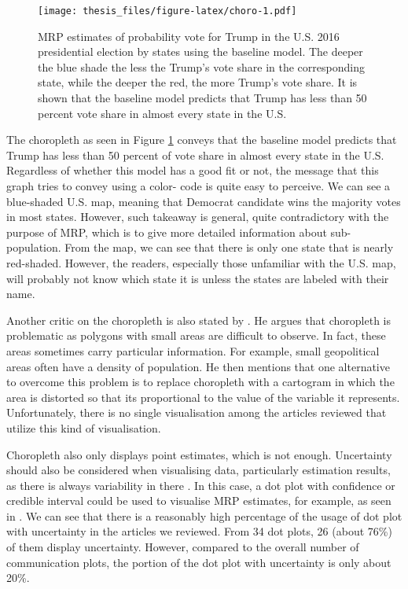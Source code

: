 \documentclass{monashthesis}
\begin{document}
\begin{figure}
\centering
\texttt{[image: thesis\_files/figure-latex/choro-1.pdf]}
\caption{\label{fig:choro}MRP estimates of probability vote for Trump in the U.S. 2016 presidential election by states using the baseline model. The deeper the blue shade the less the Trump's vote share in the corresponding state, while the deeper the red, the more Trump's vote share. It is shown that the baseline model predicts that Trump has less than 50 percent vote share in almost every state in the U.S.}
\end{figure}

The choropleth as seen in Figure \ref{fig:choro} conveys that the baseline model predicts that Trump has less than 50 percent of vote share in almost every state in the U.S. Regardless of whether this model has a good fit or not, the message that this graph tries to convey using a color- code is quite easy to perceive. We can see a blue-shaded U.S. map, meaning that Democrat candidate wins the majority votes in most states. However, such takeaway is general, quite contradictory with the purpose of MRP, which is to give more detailed information about sub-population. From the map, we can see that there is only one state that is nearly red-shaded. However, the readers, especially those unfamiliar with the U.S. map, will probably not know which state it is unless the states are labeled with their name.

Another critic on the choropleth is also stated by \textcite{statgraph}. He argues that choropleth is problematic as polygons with small areas are difficult to observe. In fact, these areas sometimes carry particular information. For example, small geopolitical areas often have a density of population. He then mentions that one alternative to overcome this problem is to replace choropleth with a cartogram in which the area is distorted so that its proportional to the value of the variable it represents. Unfortunately, there is no single visualisation among the articles reviewed that utilize this kind of visualisation.

Choropleth also only displays point estimates, which is not enough. Uncertainty should also be considered when visualising data, particularly estimation results, as there is always variability in there \autocite{tukey,MIDWAY2020100141,HullmanJessica2019IPoE}. In this case, a dot plot with confidence or credible interval could be used to visualise MRP estimates, for example, as seen in \textcite{EnnsPeterK2013POit}. We can see that there is a reasonably high percentage of the usage of dot plot with uncertainty in the articles we reviewed. From 34 dot plots, 26 (about 76\%) of them display uncertainty. However, compared to the overall number of communication plots, the portion of the dot plot with uncertainty is only about 20\%.
\end{document}
